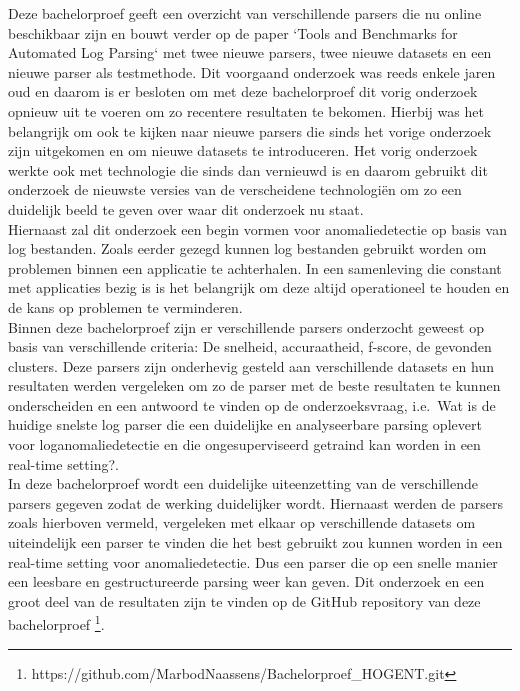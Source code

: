 Deze bachelorproef geeft een overzicht van verschillende parsers die nu online beschikbaar zijn en bouwt verder op de paper `Tools and Benchmarks for Automated Log Parsing` \autocite{TBA2019} met twee nieuwe parsers, twee nieuwe datasets en een nieuwe parser als testmethode. Dit voorgaand onderzoek was reeds enkele jaren oud en daarom is er besloten om met deze bachelorproef dit vorig onderzoek opnieuw uit te voeren om zo recentere resultaten te bekomen. Hierbij was het belangrijk om ook te kijken naar nieuwe parsers die sinds het vorige onderzoek zijn uitgekomen en om nieuwe datasets te introduceren. Het vorig onderzoek werkte ook met technologie die sinds dan vernieuwd is en daarom gebruikt dit onderzoek de nieuwste versies van de verscheidene technologiën om zo een duidelijk beeld te geven over waar dit onderzoek nu staat.\\

Hiernaast zal dit onderzoek een begin vormen voor anomaliedetectie op basis van log bestanden. Zoals eerder gezegd kunnen log bestanden gebruikt worden om problemen binnen een applicatie te achterhalen. In een samenleving die constant met applicaties bezig is is het belangrijk om deze altijd operationeel te houden en de kans op problemen te verminderen.\\

Binnen deze bachelorproef zijn er verschillende parsers onderzocht geweest op basis van verschillende criteria: De snelheid, accuraatheid, f-score, de gevonden clusters. Deze parsers zijn onderhevig gesteld aan verschillende datasets en hun resultaten werden vergeleken om zo de parser met de beste resultaten te kunnen onderscheiden en een antwoord te vinden op de onderzoeksvraag, i.e.\ Wat is de huidige snelste log parser die een duidelijke en analyseerbare parsing oplevert voor loganomaliedetectie en die ongesuperviseerd getraind kan worden in een real-time setting?.\\

In deze bachelorproef wordt een duidelijke uiteenzetting van de verschillende parsers gegeven zodat de werking duidelijker wordt. Hiernaast werden de parsers zoals hierboven vermeld, vergeleken met elkaar op verschillende datasets om uiteindelijk een parser te vinden die het best gebruikt zou kunnen worden in een real-time setting voor anomaliedetectie. Dus een parser die op een snelle manier een leesbare en gestructureerde parsing weer kan geven. Dit onderzoek en een groot deel van de resultaten zijn te vinden op de GitHub repository van deze bachelorproef \footnote{https://github.com/MarbodNaassens/Bachelorproef\_HOGENT.git}.\\


